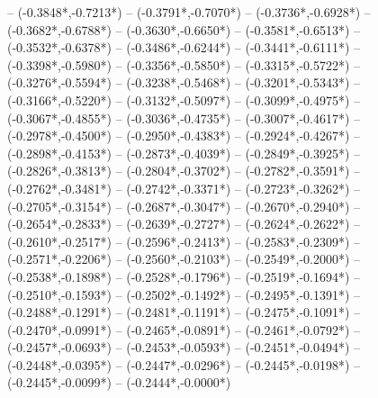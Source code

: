 {	-- ({-0.3848*\dx},{-0.7213*\dy})
	-- ({-0.3791*\dx},{-0.7070*\dy})
	-- ({-0.3736*\dx},{-0.6928*\dy})
	-- ({-0.3682*\dx},{-0.6788*\dy})
	-- ({-0.3630*\dx},{-0.6650*\dy})
	-- ({-0.3581*\dx},{-0.6513*\dy})
	-- ({-0.3532*\dx},{-0.6378*\dy})
	-- ({-0.3486*\dx},{-0.6244*\dy})
	-- ({-0.3441*\dx},{-0.6111*\dy})
	-- ({-0.3398*\dx},{-0.5980*\dy})
	-- ({-0.3356*\dx},{-0.5850*\dy})
	-- ({-0.3315*\dx},{-0.5722*\dy})
	-- ({-0.3276*\dx},{-0.5594*\dy})
	-- ({-0.3238*\dx},{-0.5468*\dy})
	-- ({-0.3201*\dx},{-0.5343*\dy})
	-- ({-0.3166*\dx},{-0.5220*\dy})
	-- ({-0.3132*\dx},{-0.5097*\dy})
	-- ({-0.3099*\dx},{-0.4975*\dy})
	-- ({-0.3067*\dx},{-0.4855*\dy})
	-- ({-0.3036*\dx},{-0.4735*\dy})
	-- ({-0.3007*\dx},{-0.4617*\dy})
	-- ({-0.2978*\dx},{-0.4500*\dy})
	-- ({-0.2950*\dx},{-0.4383*\dy})
	-- ({-0.2924*\dx},{-0.4267*\dy})
	-- ({-0.2898*\dx},{-0.4153*\dy})
	-- ({-0.2873*\dx},{-0.4039*\dy})
	-- ({-0.2849*\dx},{-0.3925*\dy})
	-- ({-0.2826*\dx},{-0.3813*\dy})
	-- ({-0.2804*\dx},{-0.3702*\dy})
	-- ({-0.2782*\dx},{-0.3591*\dy})
	-- ({-0.2762*\dx},{-0.3481*\dy})
	-- ({-0.2742*\dx},{-0.3371*\dy})
	-- ({-0.2723*\dx},{-0.3262*\dy})
	-- ({-0.2705*\dx},{-0.3154*\dy})
	-- ({-0.2687*\dx},{-0.3047*\dy})
	-- ({-0.2670*\dx},{-0.2940*\dy})
	-- ({-0.2654*\dx},{-0.2833*\dy})
	-- ({-0.2639*\dx},{-0.2727*\dy})
	-- ({-0.2624*\dx},{-0.2622*\dy})
	-- ({-0.2610*\dx},{-0.2517*\dy})
	-- ({-0.2596*\dx},{-0.2413*\dy})
	-- ({-0.2583*\dx},{-0.2309*\dy})
	-- ({-0.2571*\dx},{-0.2206*\dy})
	-- ({-0.2560*\dx},{-0.2103*\dy})
	-- ({-0.2549*\dx},{-0.2000*\dy})
	-- ({-0.2538*\dx},{-0.1898*\dy})
	-- ({-0.2528*\dx},{-0.1796*\dy})
	-- ({-0.2519*\dx},{-0.1694*\dy})
	-- ({-0.2510*\dx},{-0.1593*\dy})
	-- ({-0.2502*\dx},{-0.1492*\dy})
	-- ({-0.2495*\dx},{-0.1391*\dy})
	-- ({-0.2488*\dx},{-0.1291*\dy})
	-- ({-0.2481*\dx},{-0.1191*\dy})
	-- ({-0.2475*\dx},{-0.1091*\dy})
	-- ({-0.2470*\dx},{-0.0991*\dy})
	-- ({-0.2465*\dx},{-0.0891*\dy})
	-- ({-0.2461*\dx},{-0.0792*\dy})
	-- ({-0.2457*\dx},{-0.0693*\dy})
	-- ({-0.2453*\dx},{-0.0593*\dy})
	-- ({-0.2451*\dx},{-0.0494*\dy})
	-- ({-0.2448*\dx},{-0.0395*\dy})
	-- ({-0.2447*\dx},{-0.0296*\dy})
	-- ({-0.2445*\dx},{-0.0198*\dy})
	-- ({-0.2445*\dx},{-0.0099*\dy})
	-- ({-0.2444*\dx},{-0.0000*\dy})
}
